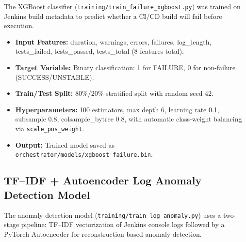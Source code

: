 \documentclass[12pt]{report}
\begin{document}
The XGBoost classifier (\texttt{training/train\_failure\_xgboost.py}) was trained on Jenkins build metadata to predict whether a CI/CD build will fail before execution.

\begin{itemize}
    \item \textbf{Input Features:} duration, warnings, errors, failures, log\_length, tests\_failed, tests\_passed, tests\_total (8 features total).
    \item \textbf{Target Variable:} Binary classification: 1 for FAILURE, 0 for non-failure (SUCCESS/UNSTABLE).
    \item \textbf{Train/Test Split:} 80\%/20\% stratified split with random seed 42.
    \item \textbf{Hyperparameters:} 100 estimators, max depth 6, learning rate 0.1, subsample 0.8, colsample\_bytree 0.8, with automatic class-weight balancing via \texttt{scale\_pos\_weight}.
    \item \textbf{Output:} Trained model saved as \texttt{orchestrator/models/xgboost\_failure.bin}.
\end{itemize}

\subsection{TF--IDF + Autoencoder Log Anomaly Detection Model}

The anomaly detection model (\texttt{training/train\_log\_anomaly.py}) uses a two-stage pipeline: TF--IDF vectorization of Jenkins console logs followed by a PyTorch Autoencoder for reconstruction-based anomaly detection.
\end{document}
